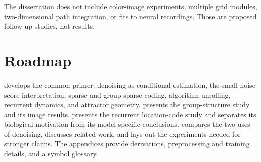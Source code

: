 The dissertation does not include color-image experiments, multiple grid modules, two-dimensional path integration, or fits to neural recordings. Those are proposed follow-up studies, not results.

\section{Roadmap}
\label{sec:intro-roadmap}

 develops the common primer: denoising as conditional estimation, the small-noise score interpretation, sparse and group-sparse coding, algorithm unrolling, recurrent dynamics, and attractor geometry.  presents the group-structure study and its image results.  presents the recurrent location-code study and separates its biological motivation from its model-specific conclusions.  compares the two uses of denoising, discusses related work, and lays out the experiments needed for stronger claims. The appendices provide derivations, preprocessing and training details, and a symbol glossary.

